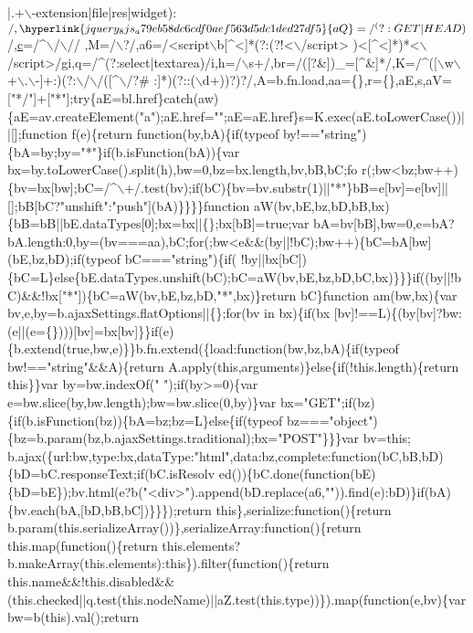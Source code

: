 \begin{DoxyCode}
{      |.+\(\backslash\)-extension|file|res|widget):$/,\hyperlink{jquery_8js_a79eb58dc6cdf0aef563d5dc1ded27df5}{aQ}=/^(?:GET|HEAD)$/,\hyperlink{jquery_8js_abce695e0af988ece0826d9ad59b8160d}{c}=/^\(\backslash\)/\(\backslash\)\textcolor{comment}{//
      ,M=/\(\backslash\)?/,a6=/<script\(\backslash\)b[^<]*(?:(?!<\(\backslash\)/script>
      )<[^<]*)*<\(\backslash\)/script>/gi,q=/^(?:select|textarea)/i,h=/\(\backslash\)s+/,br=/([?&])\_=[^&]*/,K=/^([\(\backslash\)w\(\backslash\)+\(\backslash\).\(\backslash\)-]+:)(?:\(\backslash\)/\(\backslash\)/([^\(\backslash\)/?#
      :]*)(?::(\(\backslash\)d+))?)?/,A=b.fn.load,aa=\{\},r=\{\},aE,s,aV=["*/"]+["*"];try\{aE=bl.href\}catch(aw)\{aE=av.createElement("a");aE.href="";aE=aE.href\}s=K.exec(aE.toLowerCase())||[];function f(e)\{return function(by,bA)\{if(typeof
       by!=="string")\{bA=by;by="*"\}if(b.isFunction(bA))\{var
       bx=by.toLowerCase().split(h),bw=0,bz=bx.length,bv,bB,bC;fo
      r(;bw<bz;bw++)\{bv=bx[bw];bC=/^\(\backslash\)+/.test(bv);if(bC)\{bv=bv.substr(1)||"*"\}bB=e[bv]=e[bv]||[];bB[bC?"unshift":"push"](bA)\}\}\}\}function aW(bv,bE,bz,bD,bB,bx)\{bB=bB||bE.dataTypes[0];bx=bx||\{\};bx[bB]=true;var
       bA=bv[bB],bw=0,e=bA?bA.length:0,by=(bv===aa),bC;for(;bw<e&&(by||!bC);bw++)\{bC=bA[bw](bE,bz,bD);if(typeof
       bC==="string")\{if(
      !by||bx[bC])\{bC=L\}else\{bE.dataTypes.unshift(bC);bC=aW(bv,bE,bz,bD,bC,bx)\}\}\}if((by||!bC)&&!bx["*"])\{bC=aW(bv,bE,bz,bD,"*",bx)\}return bC\}function am(bw,bx)\{var bv,e,by=b.ajaxSettings.flatOptions||\{\};for(bv in
       bx)\{if(bx
      [bv]!==L)\{(by[bv]?bw:(e||(e=\{\})))[bv]=bx[bv]\}\}if(e)\{b.extend(true,bw,e)\}\}b.fn.extend(\{load:function(bw,bz,bA)\{if(typeof bw!=="string"&&A)\{return A.apply(this,arguments)\}else\{if(!this.length)\{return this\}\}var
       by=bw.indexOf(" ");if(by>=0)\{var e=bw.slice(by,bw.length);bw=bw.slice(0,by)\}var
       bx="GET";if(bz)\{if(b.isFunction(bz))\{bA=bz;bz=L\}else\{if(typeof bz==="object")\{bz=b.param(bz,b.ajaxSettings.traditional);bx="POST"\}\}\}var
       bv=this;
      b.ajax(\{url:bw,type:bx,dataType:"html",data:bz,complete:function(bC,bB,bD)\{bD=bC.responseText;if(bC.isResolv
      ed())\{bC.done(function(bE)\{bD=bE\});bv.html(e?b("<div>").append(bD.replace(a6,"")).find(e):bD)\}if(bA)\{bv.each(bA,[bD,bB,bC])\}\}\});return this\},serialize:function()\{return
       b.param(this.serializeArray())\},serializeArray:function()\{return this.map(function()\{return
       this.elements?b.makeArray(this.elements):this\}).filter(function()\{return
       this.name&&!this.disabled&&(this.checked||q.test(this.nodeName)||aZ.test(this.type))\}).map(function(e,bv)\{var bw=b(this).val();return
}}
\end{DoxyCode}

